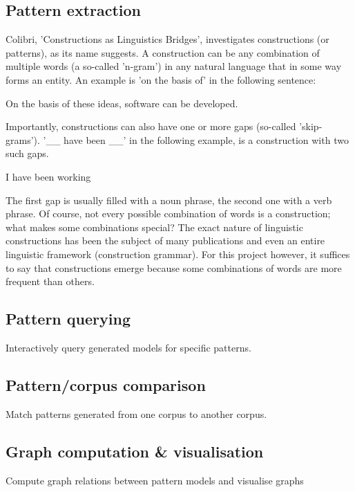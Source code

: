 \documentclass[12pt]{article}
\begin{document}
\subsection{Pattern extraction}

Colibri, 'Constructions as Linguistics Bridges', investigates constructions (or patterns), as its name suggests. A construction can be any combination of multiple words (a so-called 'n-gram') in any natural language that in some way forms an entity. An example is 'on the basis of' in the following sentence:

\begin{examples}
\item On the basis of these ideas, software can be developed.
\end{examples}

Importantly, constructions can also have one or more gaps (so-called 'skip-grams'). '\_\_ have been \_\_' in the following example, is a construction with two such gaps. 

\begin{examples}
\item I have been working
\end{examples}

The first gap is usually filled with a noun phrase, the second one with a verb phrase. Of course, not every possible combination of words is a construction; what makes some combinations special? The exact nature of linguistic constructions has been the subject of many publications and even an entire linguistic framework (construction grammar). For this project however, it suffices to say that constructions emerge because some combinations of words are more frequent than others.


\subsection{Pattern querying} Interactively query generated models for specific patterns.
\subsection{Pattern/corpus comparison} Match patterns generated from one corpus to another corpus.
\subsection{Graph computation \& visualisation} Compute graph relations between pattern models and visualise graphs
\end{document}
